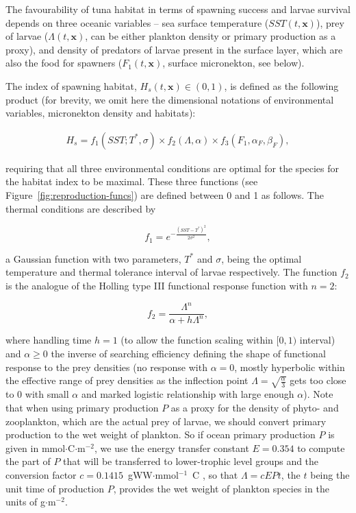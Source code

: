 The favourability of tuna habitat in terms of spawning success and larvae survival depends on three oceanic variables -- sea surface temperature ($SST(t,\mathbf{x})$), prey of larvae ($\Lambda(t,\mathbf{x})$, can be either plankton density or primary production as a proxy), and density of predators of larvae present in the surface layer, which are also the food for spawners ($F_1(t,\mathbf{x})$, surface micronekton, see below).  

The index of spawning habitat, $H_s(t,\mathbf{x}) \in (0,1)$, is defined as the following product (for brevity, we omit here the dimensional notations of environmental variables, micronekton density and habitats):

\begin{align}
	H_s = f_1(SST;{T}^{*},\sigma) \times f_2(\Lambda,\alpha) \times f_3(F_1,\alpha_F,\beta_F),
\label{eq:spawning_habitat}
\end{align}

\noindent requiring that all three environmental conditions are optimal for the species for the habitat index to be maximal. These three functions (see Figure~\ref{fig:reproduction-funcs}) are defined between 0 and 1 as follows. The thermal conditions are described by

\begin{equation}
f_1 = e^{-\frac{\left(SST-T^*\right)^2}{2\sigma^2}},
\label{eq:spawning-thermal}
\end{equation}

\noindent a Gaussian function with two parameters, ${T}^{*}$ and $\sigma$, being the optimal temperature and thermal tolerance interval of larvae respectively. The function $f_2$ is the analogue of the Holling type III functional response function with $n=2$:

\begin{equation}
f_2=\frac{\Lambda^n}{\alpha+h\Lambda^n},
\label{eq:spawning-prey}
\end{equation}

\noindent where handling time $h=1$ (to allow the function scaling within $[0,1)$ interval) and $\alpha\ge0$ the inverse of searching efficiency defining the shape of functional response to the prey densities (no response with $\alpha=0$, mostly hyperbolic within the effective range of prey densities as the inflection point $\Lambda=\sqrt{\frac{\alpha}{3}}$ gets too close to 0 with small $\alpha$ and marked logistic relationship with large enough $\alpha$). Note that when using primary production $P$ as a proxy for the density of phyto- and zooplankton, which are the actual prey of larvae, we should convert primary production to the wet weight of plankton. So if ocean primary production $P$ is given in mmol$\cdot$C$\cdot$m$^{-2}$, we use the energy transfer constant $E=0.354$ to compute the part of $P$ that will be transferred to lower-trophic level groups \citep*[see][]{Lehodey2015} and the conversion factor $c=0.1415$~gWW$\cdot$mmol$^{-1}$~C \citep{Iverson}, so that $\Lambda=cEPt$, the $t$ being the unit time of production $P$, provides the wet weight of plankton species in the units of g$\cdot$m$^{-2}$. 



